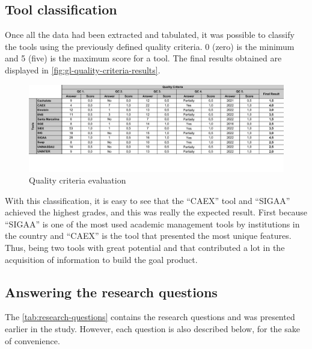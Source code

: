 \subsection{Tool classification}\label{sec:gl-tool-classification}

Once all the data had been extracted and tabulated, it was possible to classify the tools using the previously defined quality criteria. 0 (zero) is the minimum and 5 (five) is the maximum score for a tool. The final results obtained are displayed in \autoref{fig:gl-quality-criteria-results}.

\begin{figure}[htb]
  \caption{Quality criteria evaluation}\label{fig:gl-quality-criteria-results}
  \begin{center}
    \includegraphics[width=16cm]{img/gl-quality-criteria-results.pdf}
  \end{center}
\end{figure}

With this classification, it is easy to see that the ``CAEX'' tool and ``\ac{SIGAA}'' achieved the highest grades, and this was really the expected result. First because ``\ac{SIGAA}'' is one of the most used academic management tools by institutions in the country and ``CAEX'' is the tool that presented the most unique features. Thus, being two tools with great potential and that contributed a lot in the acquisition of information to build the goal product.

\subsection{Answering the research questions}\label{sec:gl-answer-research-questions}

The \autoref{tab:research-questions} contains the research questions and was presented earlier in the study. However, each question is also described below, for the sake of convenience.

